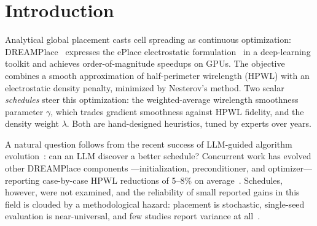 \documentclass[conference]{IEEEtran}
\begin{document}
\section{Introduction}

Analytical global placement casts cell spreading as continuous
optimization: DREAMPlace~\cite{lin2019dreamplace} expresses the ePlace
electrostatic formulation~\cite{lu2015eplace} in a deep-learning toolkit
and achieves order-of-magnitude speedups on GPUs. The objective combines a
smooth approximation of half-perimeter wirelength (HPWL) with an
electrostatic density penalty, minimized by Nesterov's method. Two scalar
\emph{schedules} steer this optimization: the weighted-average wirelength
smoothness parameter $\gamma$, which trades gradient smoothness against
HPWL fidelity, and the density weight $\lambda$. Both are hand-designed
heuristics, tuned by experts over years.

A natural question follows from the recent success of LLM-guided
algorithm evolution~\cite{novikov2025alphaevolve}: can an LLM discover a
better schedule? Concurrent work has evolved other DREAMPlace components
---initialization, preconditioner, and optimizer---reporting case-by-case
HPWL reductions of 5--8\% on average~\cite{yao2025evolution}. Schedules,
however, were not examined, and the reliability of small reported gains in
this field is clouded by a methodological hazard: placement is stochastic,
single-seed evaluation is near-universal, and few studies report variance
at all~\cite{cheng2023assessment,markov2023false}.
\end{document}
